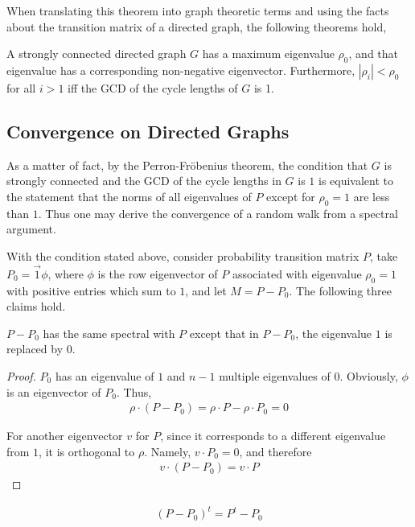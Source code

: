 When translating this theorem into graph theoretic terms and using the facts about
the transition matrix of a directed graph, the following theorems hold,
\begin{theorem}
A strongly connected directed graph $G$ has a maximum eigenvalue $\rho_0$, and that
eigenvalue has a corresponding non-negative eigenvector. Furthermore,
$|\rho_i|<\rho_0$ for all $i>1$ iff the GCD of the cycle lengths of $G$ is 1.
\end{theorem}

\subsection{Convergence on Directed Graphs}
As a matter of fact, by the Perron-Fr\"obenius theorem, the
condition that $G$ is strongly connected and the GCD of the cycle
lengths in $G$ is $1$ is equivalent to the statement that the norms
of all eigenvalues of $P$ except for $\rho_0=1$ are less than $1$.
Thus one may derive the convergence of a random walk from a spectral
argument.

With the condition stated above, consider probability transition
matrix $P$, take $P_0=\overrightarrow{1}\phi$, where $\phi$ is the
row eigenvector of $P$ associated with eigenvalue $\rho_0=1$ with
positive entries which sum to $1$, and let $M=P-P_0$. The following
three claims hold.

\begin{claim}
$P-P_0$ has the same spectral with $P$ except that in $P-P_0$, the
eigenvalue $1$ is replaced by $0$.
\end{claim}
\begin{proof}
$P_0$ has an eigenvalue of $1$ and $n-1$ multiple eigenvalues of
$0$. Obviously, $\phi$ is an eigenvector of $P_0$. Thus,
\begin{eqnarray*}
\rho\cdot (P-P_0)=\rho\cdot P-\rho\cdot P_0=0
\end{eqnarray*}

For another eigenvector $v$ for $P$, since it corresponds to a
different eigenvalue from $1$, it is orthogonal to $\rho$. Namely,
$v\cdot P_0=0$, and therefore
\begin{eqnarray*}
v\cdot(P-P_0)=v\cdot P
\end{eqnarray*}
\end{proof}

\begin{claim}
\begin{eqnarray*}
(P-P_0)^t=P^t-P_0
\end{eqnarray*}
\end{claim}

